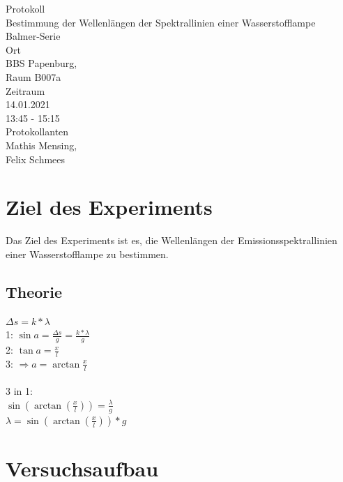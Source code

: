 \documentclass[12pt, a4paper]{article}
\begin{document}
\begin{titlepage}
\begin{center}
    \large{Protokoll} \\
    \LARGE{Bestimmung der Wellenlängen der Spektrallinien einer Wasserstofflampe} \\
    \Large{Balmer-Serie} \\
    \vspace{10mm}
    \small{Ort} \\
    \Large{ BBS Papenburg,\\ 
            Raum B007a} \\
    \vspace{10mm}
    \small{Zeitraum} \\
    \Large{ 14.01.2021 \\
            13:45 - 15:15} \\
    \vspace{15mm}
    \small{Protokollanten} \\
    \Large{ Mathis Mensing, \\
            Felix Schmees }
\end{center}

\thispagestyle{empty}
\end{titlepage}

\tableofcontents
\newpage

\section{Ziel des Experiments}
Das Ziel des Experiments ist es, die Wellenlängen der Emissionsspektrallinien einer Wasserstofflampe zu bestimmen.

\subsection{Theorie}
$\Delta s = k * \lambda$ \\
1: $\sin a = \frac{\Delta s}{g} = \frac{k * \lambda}{g}$ \\
2: $\tan a = \frac{x}{l}$ \\
3: $\Rightarrow a = \arctan \frac{x}{l}$ \\\\
3 in 1:\\
$\sin(\arctan(\frac{x}{l})) = \frac{\lambda}{g}$ \\
$\lambda = \sin(\arctan(\frac{x}{l})) * g$

\section{Versuchsaufbau}
\end{document}
